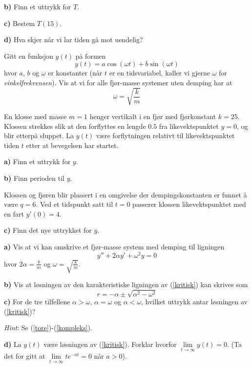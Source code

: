\textbf{b)} Finn et uttrykk for $ T $.\os

\textbf{c)} Bestem $ T(15) $.\os

\textbf{d)} Hva skjer når vi lar tiden gå mot uendelig?

Gitt en funksjon $ y(t) $ på formen
\[y(t) =a\cos (\omega t) +b\sin (\omega t) \] 
hvor $ a $, $ b $ og $ \omega $ er konstanter (når $ t $ er en tidsvariabel, kaller vi gjerne $ \omega $ for \textit{vinkelfrekvensen}). Vis at vi for alle fjør-masse systemer uten demping har at
\[ \omega=\sqrt{\frac{k}{m}} \] 

En klosse med masse $ {m=1} $ henger vertikalt i en fjør med fjørkonstant $ {k=25} $. Klossen strekkes slik at den forflyttes en lengde $ 0.5 $ fra likevektspunktet $ {y=0} $, og blir etterpå sluppet. La $ y(t) $ være forflytningen relativt til likevektspunktet tiden $ t $ etter at bevegelsen har startet.\os

\textbf{a)} Finn et uttrykk for $ y $.\os

\textbf{b)} Finn perioden til $ y $.

Klossen og fjøren blir plassert i en omgivelse der dempingskonstanten er funnet å være $ {q=6} $. Ved et tidspunkt satt til $ {t=0} $ passerer klossen likevektspunktet med en fart $ y'(0)=4 $.\os

\textbf{c)} Finn det nye uttrykket for $ y $. 

\ekspop
\textbf{a)} Vis at vi kan omskrive et fjør-masse system med demping til ligningen
\[ y''+2\alpha y'+\omega^2y=0 \tag{I}\label{kritisk} \]
hvor $ 2\alpha=\frac{b}{m} $ og $ \omega=\sqrt{\frac{k}{m}} $.\os

\textbf{b)} Vis at løsningen av den karakteristiske ligningen av (\ref{kritisk}) kan skrives som
\[ r=-\alpha\pm\sqrt{\alpha^2-\omega^2} \]
\textbf{c)} For de tre tilfellene $ \alpha>\omega $, $ \alpha=\omega $ og $ \alpha<\omega $, hvilket uttrykk antar løsningen av (\ref{kritisk})? \os

\textsl{Hint}: Se (\ref{tore})-(\ref{kompleks}).\os%

\textbf{d)} La $ y(t) $ være løsningen av (\ref{kritisk}). Forklar hvorfor $ \lim\limits_{t\to\infty}y(t) =0 $. (Ta det for gitt at $ \lim\limits_{t\to \infty} te^{-at}=0 $ når $ a>0 $).
